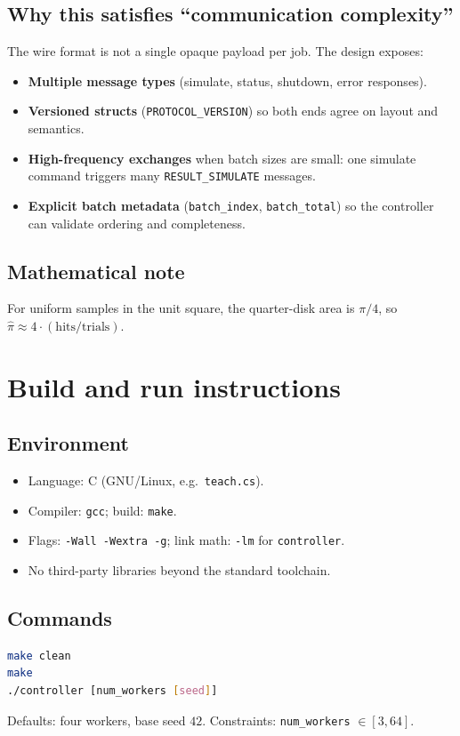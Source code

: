 \documentclass[11pt]{article}
\begin{document}
\subsection{Why this satisfies ``communication complexity''}
The wire format is not a single opaque payload per job. The design exposes:
\begin{itemize}
  \item \textbf{Multiple message types} (simulate, status, shutdown, error responses).
  \item \textbf{Versioned structs} (\texttt{PROTOCOL\_VERSION}) so both ends agree on layout and semantics.
  \item \textbf{High-frequency exchanges} when batch sizes are small: one simulate command triggers many \texttt{RESULT\_SIMULATE} messages.
  \item \textbf{Explicit batch metadata} (\texttt{batch\_index}, \texttt{batch\_total}) so the controller can validate ordering and completeness.
\end{itemize}

\subsection{Mathematical note}
For uniform samples in the unit square, the quarter-disk area is $\pi/4$, so $\hat{\pi} \approx 4\cdot(\mathrm{hits}/\mathrm{trials})$.

\section{Build and run instructions}
\label{sec:build}

\subsection{Environment}
\begin{itemize}
  \item Language: C (GNU/Linux, e.g.\ \texttt{teach.cs}).
  \item Compiler: \texttt{gcc}; build: \texttt{make}.
  \item Flags: \texttt{-Wall -Wextra -g}; link math: \texttt{-lm} for \texttt{controller}.
  \item No third-party libraries beyond the standard toolchain.
\end{itemize}

\subsection{Commands}
\begin{lstlisting}[language=bash]
make clean
make
./controller [num_workers [seed]]
\end{lstlisting}
Defaults: four workers, base seed $42$. Constraints: \texttt{num\_workers} $\in [3,64]$.
\end{document}
